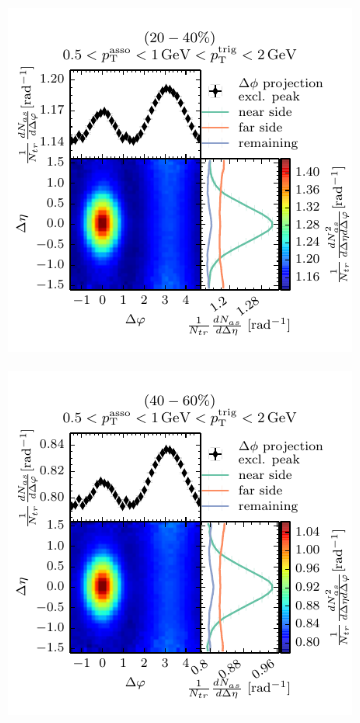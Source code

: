\begin{figure}
\begin{subfigure}[b]{0.5\textwidth}
    \includegraphics[]{figures/051_12_class1.pdf}
  \end{subfigure}
  \begin{subfigure}[b]{0.5\textwidth}
    \includegraphics[]{figures/051_12_class2.pdf}
  \end{subfigure}%
  \begin{subfigure}[b]{0.5\textwidth}

\end{subfigure}
\end{figure}
